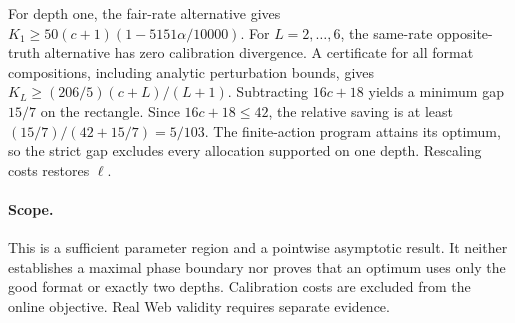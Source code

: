 For depth one, the fair-rate alternative gives
$K_1\ge50(c+1)(1-5151\alpha/10000)$.
For $L=2,\ldots,6$, the same-rate opposite-truth alternative has zero
calibration divergence. A certificate for all format compositions,
including analytic perturbation bounds, gives
$K_L\ge(206/5)(c+L)/(L+1)$.
Subtracting $16c+18$ yields a minimum gap $15/7$ on the rectangle.
Since $16c+18\le42$, the relative saving is at least
$(15/7)/(42+15/7)=5/103$.
The finite-action program attains its optimum, so the strict gap excludes
every allocation supported on one depth. Rescaling costs restores $\ell$.

\paragraph{Scope.}
This is a sufficient parameter region and a pointwise asymptotic result.
It neither establishes a maximal phase boundary nor proves that an optimum
uses only the good format or exactly two depths. Calibration costs are
excluded from the online objective. Real Web validity requires separate evidence.
